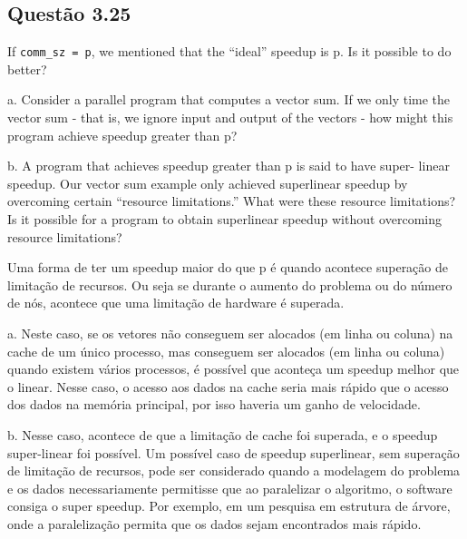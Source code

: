 

\subsection{Questão 3.25}
If \texttt{comm\_sz = p}, we mentioned that the “ideal” speedup is p. Is it possible to do better?

a. Consider a parallel program that computes a vector sum. If we only time
the vector sum - that is, we ignore input and output of the vectors - how
might this program achieve speedup greater than p?

b. A program that achieves speedup greater than p is said to have super-
linear speedup. Our vector sum example only achieved superlinear
speedup by overcoming certain “resource limitations.” What were these
resource limitations? Is it possible for a program to obtain superlinear
speedup without overcoming resource limitations?

Uma forma de ter um speedup maior do que p é quando acontece superação de limitação de recursos. Ou seja se durante o aumento do problema ou do número de nós, acontece que uma limitação de hardware é superada.

a. Neste caso, se os vetores não conseguem ser alocados (em linha ou coluna) na cache de um único processo, mas conseguem ser alocados (em linha ou coluna) quando existem vários processos, é possível que aconteça um speedup melhor que o linear. Nesse caso, o acesso aos dados na cache seria mais rápido que o acesso dos dados na memória principal, por isso haveria um ganho de velocidade.

b. Nesse caso, acontece de que a limitação de cache foi superada, e o speedup super-linear foi possível.
Um possível caso de speedup superlinear, sem superação de limitação de recursos, pode ser considerado quando a modelagem do problema e os dados necessariamente permitisse que ao paralelizar o algoritmo, o software consiga o super speedup. Por exemplo, em um pesquisa em estrutura de árvore, onde a paralelização permita que os dados sejam encontrados mais rápido.
 
